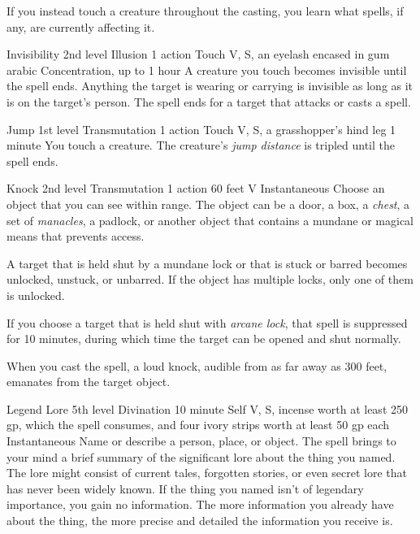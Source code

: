 \documentclass[10pt,a4paper,twoside,bg=print,twocolumn,openany,nodeprecatedcode]{dndbook}
\begin{document}
If you instead touch a creature throughout the casting, you learn what spells, if any, are currently affecting it.



\DndSpellHeader%
{Invisibility}
{2nd level Illusion}
{1 action}
{Touch}
{V, S, an eyelash encased in gum arabic}
{Concentration, up to 1 hour}
A creature you touch becomes invisible until the spell ends. Anything the target is wearing or carrying is invisible as long as it is on the target's person. The spell ends for a target that attacks or casts a spell.



\DndSpellHeader%
{Jump}
{1st level Transmutation}
{1 action}
{Touch}
{V, S, a grasshopper's hind leg}
{1 minute}
You touch a creature. The creature's \textit{jump distance} is tripled until the spell ends.



\DndSpellHeader%
{Knock}
{2nd level Transmutation}
{1 action}
{60 feet}
{V}
{Instantaneous}
Choose an object that you can see within range. The object can be a door, a box, a \textit{chest}, a set of \textit{manacles}, a padlock, or another object that contains a mundane or magical means that prevents access.

A target that is held shut by a mundane lock or that is stuck or barred becomes unlocked, unstuck, or unbarred. If the object has multiple locks, only one of them is unlocked.

If you choose a target that is held shut with \textit{arcane lock}, that spell is suppressed for 10 minutes, during which time the target can be opened and shut normally.

When you cast the spell, a loud knock, audible from as far away as 300 feet, emanates from the target object.



\DndSpellHeader%
{Legend Lore}
{5th level Divination}
{10 minute}
{Self}
{V, S, incense worth at least 250 gp, which the spell consumes, and four ivory strips worth at least 50 gp each}
{Instantaneous}
Name or describe a person, place, or object. The spell brings to your mind a brief summary of the significant lore about the thing you named. The lore might consist of current tales, forgotten stories, or even secret lore that has never been widely known. If the thing you named isn't of legendary importance, you gain no information. The more information you already have about the thing, the more precise and detailed the information you receive is.
\end{document}
